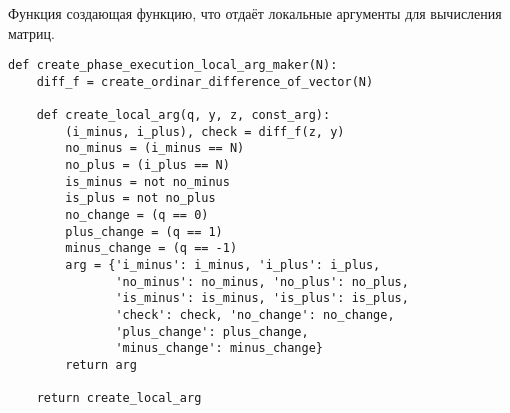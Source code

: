 Функция создающая функцию, что отдаёт 
локальные аргументы для вычисления матриц.
\begin{verbatim}
def create_phase_execution_local_arg_maker(N):
    diff_f = create_ordinar_difference_of_vector(N)

    def create_local_arg(q, y, z, const_arg):
        (i_minus, i_plus), check = diff_f(z, y)
        no_minus = (i_minus == N)
        no_plus = (i_plus == N)
        is_minus = not no_minus
        is_plus = not no_plus
        no_change = (q == 0)
        plus_change = (q == 1)
        minus_change = (q == -1)
        arg = {'i_minus': i_minus, 'i_plus': i_plus,
               'no_minus': no_minus, 'no_plus': no_plus,
               'is_minus': is_minus, 'is_plus': is_plus,
               'check': check, 'no_change': no_change,
               'plus_change': plus_change,
               'minus_change': minus_change}
        return arg

    return create_local_arg
\end{verbatim}

